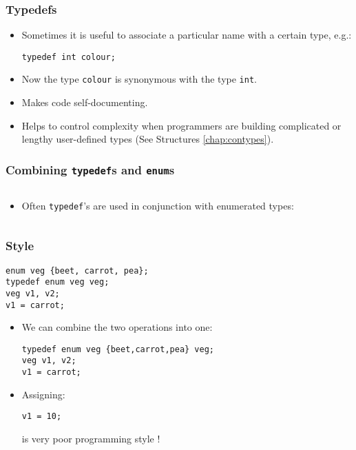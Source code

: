 \begin{frame}[fragile]
\frametitle{Typedefs}

\begin{itemize}[<+->]
\item Sometimes it is useful to associate a particular name with
a certain type, e.g.:
\begin{verbatim}
typedef int colour;
\end{verbatim}
\item Now the type \verb^colour^ is synonymous with the type \verb^int^.
\item Makes code self-documenting.
\item Helps to control complexity when programmers are building
complicated or lengthy user-defined types (See Structures \ref{chap:contypes}).
\end{itemize}
\end{frame}

\begin{frame}[fragile]
\frametitle{Combining {\tt typedef}s and {\tt enum}s}
\begin{columns}

\begin{column}{0.45\textwidth}
\begin{itemize}[<+->]
\item Often \verb^typedef^'s are used in conjunction with enumerated types:
\end{itemize}


\end{column}

\begin{column}{0.45\textwidth}

\end{column}

\end{columns}
\end{frame}

\begin{frame}[fragile]
\frametitle{Style}

\begin{verbatim}
enum veg {beet, carrot, pea};
typedef enum veg veg;
veg v1, v2;
v1 = carrot;
\end{verbatim}
\begin{itemize}[<+->]
\item We can combine the two operations into one:
{\small
\begin{verbatim}
typedef enum veg {beet,carrot,pea} veg;
veg v1, v2;
v1 = carrot;
\end{verbatim}
}
\item Assigning:
\begin{verbatim}
v1 = 10;
\end{verbatim}
is very poor programming style !
\end{itemize}
\end{frame}


